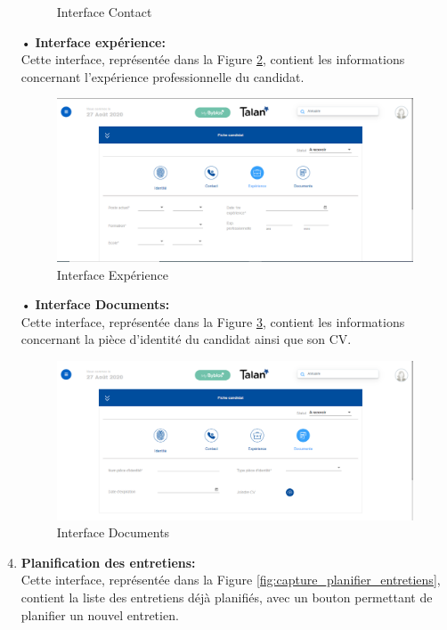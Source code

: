 \begin{enumerate}[label=\textbf{\arabic*. }]
\begin{figure}[H]
     \caption{Interface Contact}
     \label{fig:capture_fiche_contact}
 \end{figure}
    \item [•] \textbf{Interface expérience:}\\ Cette interface, représentée dans la Figure \ref{fig:capture_fiche_experience}, contient les informations concernant l'expérience professionnelle du candidat.  
     \begin{figure}[H]
     \centering
     \includegraphics[scale=0.5]{img/capture fiche candidat experience.PNG}
     \caption{Interface Expérience}
     \label{fig:capture_fiche_experience}
 \end{figure}
    \item [•] \textbf{Interface Documents:}\\ Cette interface, représentée dans la Figure \ref{fig:capture_fiche_documents}, contient les informations concernant la pièce d'identité du candidat ainsi que son CV.
     \begin{figure}[H]
     \centering
     \includegraphics[scale=0.5]{img/capture fiche candidat Documents.PNG}
     \caption{Interface Documents}
     \label{fig:capture_fiche_documents}
 \end{figure}
\item \textbf{Planification des entretiens:}\\ Cette interface, représentée dans la Figure \ref{fig:capture_planifier_entretiens}, contient la liste des entretiens déjà planifiés, avec un bouton permettant de planifier un nouvel entretien.

\end{enumerate}
